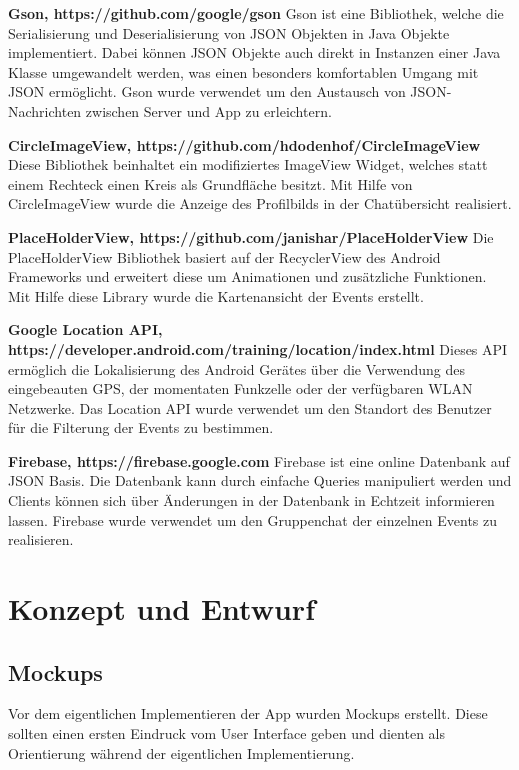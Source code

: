 \documentclass{scrartcl}
\begin{document}
\textbf{Gson, https://github.com/google/gson} \newline
Gson ist eine Bibliothek, welche die Serialisierung und Deserialisierung von
JSON Objekten in Java Objekte implementiert. Dabei können JSON Objekte auch
direkt in Instanzen einer Java Klasse umgewandelt werden, was einen besonders
komfortablen Umgang mit JSON ermöglicht. Gson wurde verwendet um den
Austausch von JSON-Nachrichten zwischen Server und App zu erleichtern.

\textbf{CircleImageView, https://github.com/hdodenhof/CircleImageView} \newline
Diese Bibliothek beinhaltet ein modifiziertes ImageView Widget, welches statt
einem Rechteck einen Kreis als Grundfläche besitzt. Mit Hilfe von
CircleImageView wurde die Anzeige des Profilbilds in der Chatübersicht
realisiert.

\textbf{PlaceHolderView, https://github.com/janishar/PlaceHolderView} \newline
Die PlaceHolderView Bibliothek basiert auf der RecyclerView des Android
Frameworks und erweitert diese um Animationen und zusätzliche Funktionen. Mit
Hilfe diese Library wurde die Kartenansicht der Events erstellt.

\textbf{Google Location API,
https://developer.android.com/training/location/index.html} \newline
Dieses API ermöglich die Lokalisierung des Android Gerätes über die Verwendung
des eingebeauten GPS, der momentaten Funkzelle oder der verfügbaren WLAN
Netzwerke. Das Location API wurde verwendet um den Standort des Benutzer für die
Filterung der Events zu bestimmen.

\textbf{Firebase, https://firebase.google.com} \newline
Firebase ist eine online Datenbank auf JSON Basis. Die Datenbank kann durch
einfache Queries manipuliert werden und Clients können sich über Änderungen in
der Datenbank in Echtzeit informieren lassen. Firebase wurde verwendet um
den Gruppenchat der einzelnen Events zu realisieren.









\section{Konzept und Entwurf}
\subsection{Mockups}
Vor dem eigentlichen Implementieren der App wurden Mockups erstellt. Diese
sollten einen ersten Eindruck vom User Interface geben und dienten als
Orientierung während der eigentlichen Implementierung.
\end{document}
